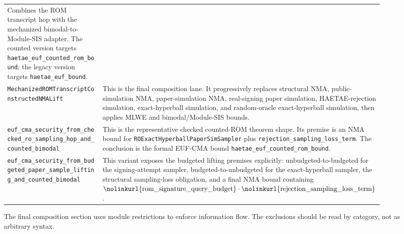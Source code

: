 \documentclass[11pt]{report}
\DeclareRobustCommand{\ec}[1]{\ifmmode\text{\nolinkurl{#1}}\else\nolinkurl{#1}\fi}
\theoremstyle{definition}
\theoremstyle{plain}
\begin{document}
\begin{longtable}{p{0.30\linewidth}p{0.60\linewidth}}
Combines the ROM transcript hop with the mechanized bimodal-to-Module-SIS
adapter.  The counted version targets \ec{haetae\_euf\_counted\_rom\_bound};
the legacy version targets \ec{haetae\_euf\_bound}. \\
\ec{MechanizedROMTranscriptConstructedNMALift} &
This is the final composition lane.  It progressively replaces structural NMA,
public-simulation NMA, paper-simulation NMA, real-signing paper simulation,
HAETAE-rejection simulation, exact-hyperball simulation, and random-oracle
exact-hyperball simulation, then applies MLWE and bimodal/Module-SIS bounds. \\
\ec{euf\_cma\_security\_from\_checked\_ro\_sampling\_hop\_and\_counted\_bimodal}
&
This is the representative checked counted-ROM theorem shape.  Its premise is
an NMA bound for \ec{ROExactHyperballPaperSimSampler} plus
\ec{rejection\_sampling\_loss\_term}.  The conclusion is the formal
EUF-CMA bound \ec{haetae\_euf\_counted\_rom\_bound}. \\
\ec{euf\_cma\_security\_from\_budgeted\_paper\_sample\_lifting\_and\_counted\_bimodal}
&
This variant exposes the budgeted lifting premises explicitly:
unbudgeted-to-budgeted for the signing-attempt sampler,
budgeted-to-unbudgeted for the exact-hyperball sampler, the structural
sampling-loss obligation, and a final NMA bound containing
\(\ec{rom\_signature\_query\_budget}\cdot
\ec{rejection\_sampling\_loss\_term}\). \\
\bottomrule
\end{longtable}

The final composition section uses module restrictions to enforce information
flow.  The exclusions should be read by category, not as arbitrary syntax.
\end{document}
